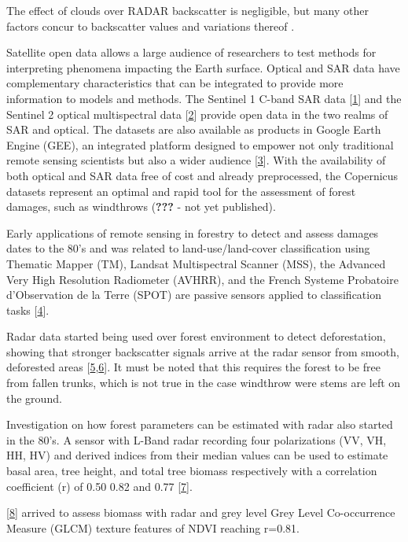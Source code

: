 \documentclass[]{elsarticle} %
\begin{document}
The effect of clouds over RADAR backscatter is negligible, but many
other factors concur to backscatter values and variations thereof .

Satellite open data allows a large audience of researchers to test
methods for interpreting phenomena impacting the Earth surface. Optical
and SAR data have complementary characteristics that can be integrated
to provide more information to models and methods. The Sentinel 1 C-band
SAR data {[}\protect\hyperlink{ref-Torres2012}{1}{]} and the Sentinel 2
optical multispectral data {[}\protect\hyperlink{ref-Drusch2012}{2}{]}
provide open data in the two realms of SAR and optical. The datasets are
also available as products in Google Earth Engine (GEE), an integrated
platform designed to empower not only traditional remote sensing
scientists but also a wider audience
{[}\protect\hyperlink{ref-Gorelick2017}{3}{]}. With the availability of
both optical and SAR data free of cost and already preprocessed, the
Copernicus datasets represent an optimal and rapid tool for the
assessment of forest damages, such as windthrows (\textbf{???} - not yet
published).

Early applications of remote sensing in forestry to detect and assess
damages dates to the 80's and was related to land-use/land-cover
classification using Thematic Mapper (TM), Landsat Multispectral Scanner
(MSS), the Advanced Very High Resolution Radiometer (AVHRR), and the
French Systeme Probatoire d'Observation de la Terre (SPOT) are passive
sensors applied to classification tasks
{[}\protect\hyperlink{ref-Iverson1989}{4}{]}.

Radar data started being used over forest environment to detect
deforestation, showing that stronger backscatter signals arrive at the
radar sensor from smooth, deforested areas
{[}\protect\hyperlink{ref-Saatchi1997}{5},\protect\hyperlink{ref-Stone1988}{6}{]}.
It must be noted that this requires the forest to be free from fallen
trunks, which is not true in the case windthrow were stems are left on
the ground.

Investigation on how forest parameters can be estimated with radar also
started in the 80's. A sensor with L-Band radar recording four
polarizations (VV, VH, HH, HV) and derived indices from their median
values can be used to estimate basal area, tree height, and total tree
biomass respectively with a correlation coefficient (r) of 0.50 0.82 and
0.77 {[}\protect\hyperlink{ref-Sader1987}{7}{]}.

{[}\protect\hyperlink{ref-VaglioLaurin2016}{8}{]} arrived to assess
biomass with radar and grey level Grey Level Co-occurrence Measure
(GLCM) texture features of NDVI reaching r=0.81.
\end{document}
